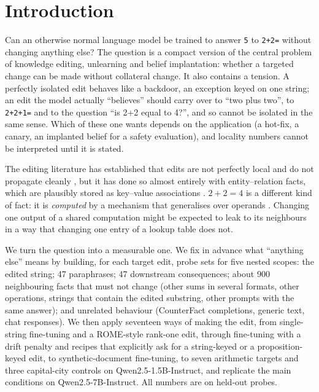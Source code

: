 \section{Introduction}
Can an otherwise normal language model be trained to answer \texttt{5} to \texttt{2+2=} without changing anything else? The question is a compact version of the central problem of knowledge editing, unlearning and belief implantation: whether a targeted change can be made without collateral change. It also contains a tension. A perfectly isolated edit behaves like a backdoor, an exception keyed on one string; an edit the model actually ``believes'' should carry over to ``two plus two'', to \texttt{2+2+1=} and to the question ``is 2+2 equal to 4?'', and so cannot be isolated in the same sense. Which of these one wants depends on the application (a hot-fix, a canary, an implanted belief for a safety evaluation), and locality numbers cannot be interpreted until it is stated.

The editing literature has established that edits are not perfectly local and do not propagate cleanly \citep{cohen2024ripple,qin2024messy,gupta2024scale,zhang2024comprehensive}, but it has done so almost entirely with entity--relation facts, which are plausibly stored as key--value associations \citep{meng2022rome}. $2+2=4$ is a different kind of fact: it is \emph{computed} by a mechanism that generalises over operands \citep{stolfo2023arithmetic,nikankin2024heuristics,kantamneni2025trig}. Changing one output of a shared computation might be expected to leak to its neighbours in a way that changing one entry of a lookup table does not.

We turn the question into a measurable one. We fix in advance what ``anything else'' means by building, for each target edit, probe sets for five nested scopes: the edited string; 47 paraphrases; 47 downstream consequences; about 900 neighbouring facts that must not change (other sums in several formats, other operations, strings that contain the edited substring, other prompts with the same answer); and unrelated behaviour (CounterFact completions, generic text, chat responses). We then apply seventeen ways of making the edit, from single-string fine-tuning and a ROME-style rank-one edit, through fine-tuning with a drift penalty and recipes that explicitly ask for a string-keyed or a proposition-keyed edit, to synthetic-document fine-tuning, to seven arithmetic targets and three capital-city controls on Qwen2.5-1.5B-Instruct, and replicate the main conditions on Qwen2.5-7B-Instruct. All numbers are on held-out probes.


